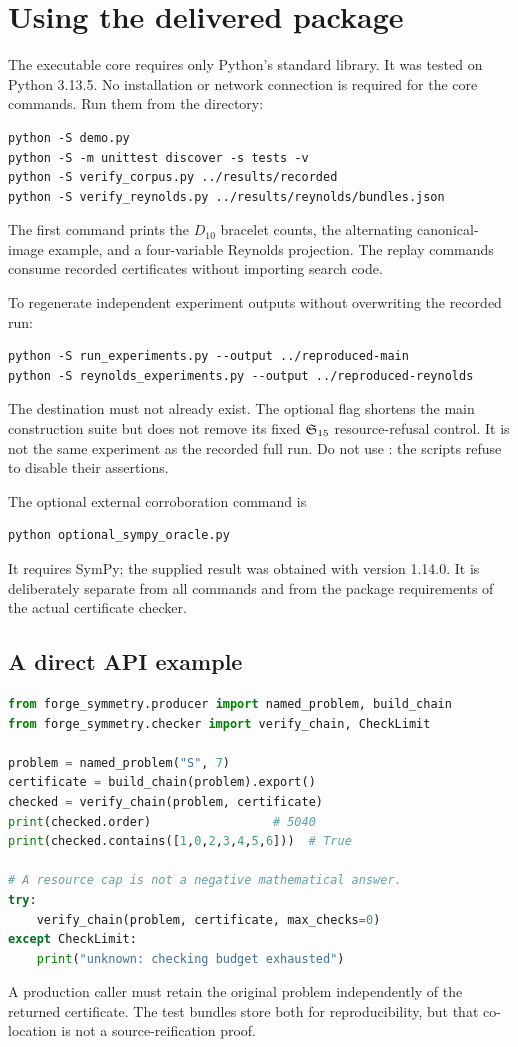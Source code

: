 \section{Using the delivered package}
\label{app:artifacts}
The executable core requires only Python's standard library. It was tested on Python 3.13.5. No installation or network connection is required for the core commands. Run them from the  directory:
\begin{lstlisting}
python -S demo.py
python -S -m unittest discover -s tests -v
python -S verify_corpus.py ../results/recorded
python -S verify_reynolds.py ../results/reynolds/bundles.json
\end{lstlisting}
The first command prints the $D_{10}$ bracelet counts, the alternating canonical-image example, and a four-variable Reynolds projection. The replay commands consume recorded certificates without importing search code.

To regenerate independent experiment outputs without overwriting the recorded run:
\begin{lstlisting}
python -S run_experiments.py --output ../reproduced-main
python -S reynolds_experiments.py --output ../reproduced-reynolds
\end{lstlisting}
The destination must not already exist. The optional  flag shortens the main construction suite but does not remove its fixed $\mathfrak S_{15}$ resource-refusal control. It is not the same experiment as the recorded full run. Do not use : the scripts refuse to disable their assertions.

The optional external corroboration command is
\begin{lstlisting}
python optional_sympy_oracle.py
\end{lstlisting}
It requires SymPy; the supplied result was obtained with version 1.14.0. It is deliberately separate from all  commands and from the package requirements of the actual certificate checker.

\subsection{A direct API example}
\begin{lstlisting}[language=Python]
from forge_symmetry.producer import named_problem, build_chain
from forge_symmetry.checker import verify_chain, CheckLimit

problem = named_problem("S", 7)
certificate = build_chain(problem).export()
checked = verify_chain(problem, certificate)
print(checked.order)                 # 5040
print(checked.contains([1,0,2,3,4,5,6]))  # True

# A resource cap is not a negative mathematical answer.
try:
    verify_chain(problem, certificate, max_checks=0)
except CheckLimit:
    print("unknown: checking budget exhausted")
\end{lstlisting}
A production caller must retain the original problem independently of the returned certificate. The test bundles store both for reproducibility, but that co-location is not a source-reification proof.

